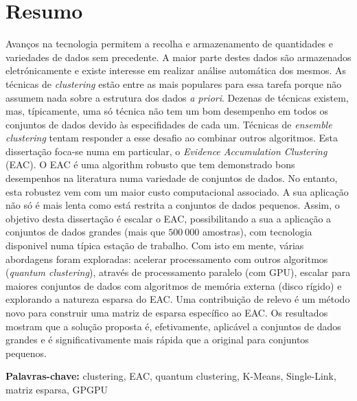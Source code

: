
\section*{Resumo}


Avanços na tecnologia permitem a recolha e armazenamento de quantidades e variedades de dados sem precedente.
A maior parte destes dados são armazenados eletrónicamente e existe interesse em realizar análise automática dos mesmos.
As técnicas de \emph{clustering} estão entre as mais populares para essa tarefa porque não assumem nada sobre a estrutura dos dados \emph{a priori}.
Dezenas de técnicas existem, mas, típicamente, uma só técnica não tem um bom desempenho em todos os conjuntos de dados devido às especifidades de cada um.
Técnicas de \emph{ensemble clustering} tentam responder a esse desafio ao combinar outros algoritmos.
Esta dissertação foca-se numa em particular, o \emph{Evidence Accumulation Clustering} (EAC).
O EAC é uma algorithm robusto que tem demonstrado bons desempenhos na literatura numa variedade de conjuntos de dados.
No entanto, esta robustez vem com um maior custo computacional associado.
A sua aplicação não só é mais lenta como está restrita a conjuntos de dados pequenos.
Assim, o objetivo desta dissertação é escalar o EAC, possibilitando a sua a aplicação a conjuntos de dados grandes (mais que $500 \: 000$ amostras), com tecnologia disponivel numa típica estação de trabalho.
Com isto em mente, várias abordagens foram exploradas: acelerar processamento com outros algoritmos (\emph{quantum clustering}), através de processamento paralelo (com GPU), escalar para maiores conjuntos de dados com algoritmos de memória externa (disco rígido) e explorando a natureza esparsa do EAC.
Uma contribuição de relevo é um método novo para construir uma matriz de esparsa específico ao EAC.
Os resultados mostram que a solução proposta é, efetivamente, aplicável a conjuntos de dados grandes e é significativamente mais rápida que a original para conjuntos pequenos.

\textbf{\Large Palavras-chave:} clustering, EAC, quantum clustering, K-Means, Single-Link, matriz esparsa, GPGPU





\cleardoublepage

